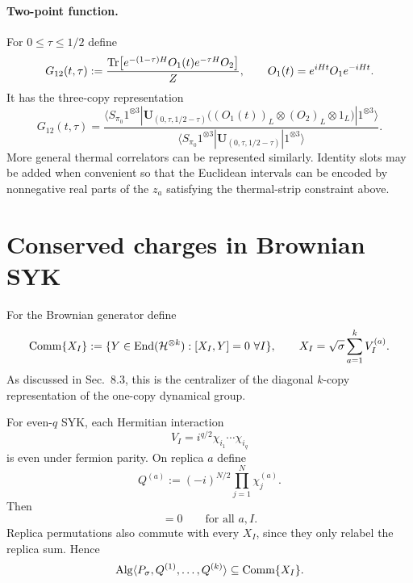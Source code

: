 \documentclass{article}
\theoremstyle{definition}
\begin{document}
\paragraph{Two-point function.}
For $0\le\tau\le1/2$ define
\begin{equation}
    G_{12}(t,\tau)
    :=\frac{
      {\rm Tr}\!\left[
        e^{-(1-\tau)H}O_1(t)e^{-\tau H}O_2
      \right]
    }{Z},
    \qquad
    O_1(t)=e^{iHt}O_1e^{-iHt}.
\end{equation}
It has the three-copy representation
\begin{equation}
    G_{12}(t,\tau)
    =\frac{
      \langle S_{\pi_0}1^{\otimes3}|
      \mathbf U_{(0,\tau,1/2-\tau)}
      \bigl((O_1(t))_L\otimes(O_2)_L\otimes1_L\bigr)
      |1^{\otimes3}\rangle
    }{
      \langle S_{\pi_0}1^{\otimes3}|
      \mathbf U_{(0,\tau,1/2-\tau)}
      |1^{\otimes3}\rangle
    }.
\end{equation}
More general thermal correlators can be represented similarly.  Identity
slots may be added when convenient so that the Euclidean intervals can be
encoded by nonnegative real parts of the $z_a$ satisfying the thermal-strip
constraint above.


\section{Conserved charges in Brownian SYK}

For the Brownian generator define
\begin{equation}
    {\rm Comm}\{X_I\}
    :=\{Y\in{\rm End}({\cal H}^{\otimes k}):[X_I,Y]=0\ \forall I\},
    \qquad
    X_I=\sqrt\sigma\sum_{a=1}^kV_I^{(a)}.
\end{equation}
As discussed in Sec.~8.3, this is the centralizer of the diagonal $k$-copy
representation of the one-copy dynamical group.

For even-$q$ SYK, each Hermitian interaction
\begin{equation}
    V_I=i^{q/2}\chi_{i_1}\cdots\chi_{i_q}
\end{equation}
is even under fermion parity.  On replica $a$ define
\begin{equation}
    Q^{(a)}
    :=(-i)^{N/2}\prod_{j=1}^N\chi_j^{(a)}.
\end{equation}
Then
\begin{equation}
    [Q^{(a)},X_I]=0
    \qquad\text{for all }a,I.
\end{equation}
Replica permutations also commute with every $X_I$, since they only relabel
the replica sum.  Hence
\begin{equation}
    {\rm Alg}\langle
       P_\sigma,Q^{(1)},\ldots,Q^{(k)}
    \rangle
    \subseteq {\rm Comm}\{X_I\}.
\end{equation}
\end{document}
